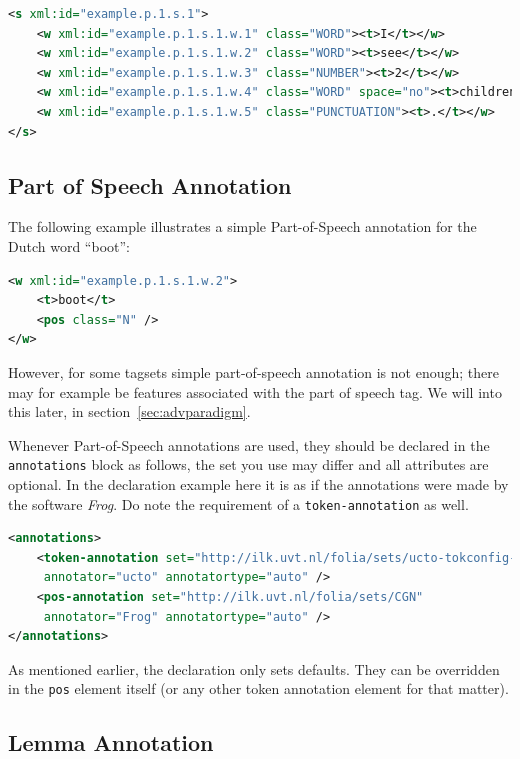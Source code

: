 \documentclass[a4paper,12pt]{report}
\begin{document}
\begin{lstlisting}[language=xml]
<s xml:id="example.p.1.s.1">
    <w xml:id="example.p.1.s.1.w.1" class="WORD"><t>I</t></w>
    <w xml:id="example.p.1.s.1.w.2" class="WORD"><t>see</t></w>
    <w xml:id="example.p.1.s.1.w.3" class="NUMBER"><t>2</t></w>
    <w xml:id="example.p.1.s.1.w.4" class="WORD" space="no"><t>children</t></w>
    <w xml:id="example.p.1.s.1.w.5" class="PUNCTUATION"><t>.</t></w>
</s>
\end{lstlisting}        


\subsection{Part of Speech Annotation}

The following example illustrates a simple Part-of-Speech annotation for the Dutch word ``boot'':

\begin{lstlisting}[language=xml]
<w xml:id="example.p.1.s.1.w.2">
    <t>boot</t>
    <pos class="N" />
</w>
\end{lstlisting}



However, for some tagsets simple part-of-speech annotation is not enough; there may for example be features associated with the part of speech tag. We will into this later, in section~\ref{sec:advparadigm}.

Whenever Part-of-Speech annotations are used, they should be declared in the \texttt{annotations} block as follows, the set you use may differ and all attributes are optional. In the declaration example here it is as if the annotations were made by the software \emph{Frog}. Do note the requirement of a \texttt{token-annotation} as well.

\begin{lstlisting}[language=xml]
<annotations>
    <token-annotation set="http://ilk.uvt.nl/folia/sets/ucto-tokconfig-nl" 
     annotator="ucto" annotatortype="auto" />
    <pos-annotation set="http://ilk.uvt.nl/folia/sets/CGN" 
     annotator="Frog" annotatortype="auto" />
</annotations>
\end{lstlisting}

As mentioned earlier, the declaration only sets defaults. They can be overridden in the \texttt{pos} element itself (or any other token annotation element for that matter).

\subsection{Lemma Annotation}
\end{document}
